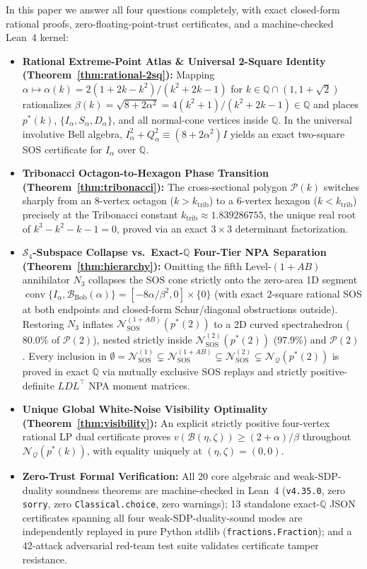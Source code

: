 \documentclass[11pt,a4paper]{article}
\newcommand{\QQ}{\mathbb{Q}}
\newcommand{\calN}{\mathcal{N}_{\mathcal{Q}}}
\newcommand{\calP}{\mathcal{P}}
\newcommand{\calB}{\mathcal{B}}
\newcommand{\calS}{\mathcal{S}}
\newcommand{\conv}{\operatorname{conv}}
\begin{document}
In this paper we answer all four questions completely, with exact closed-form rational proofs, zero-floating-point-trust certificates, and a machine-checked Lean~4 kernel:
\begin{itemize}[leftmargin=1.5em,itemsep=2pt]
  \item \textbf{Rational Extreme-Point Atlas \& Universal 2-Square Identity (Theorem~\ref{thm:rational-2sq}):} Mapping $\alpha \mapsto \alpha(k) = 2(1+2k-k^2)/(k^2+2k-1)$ for $k \in \QQ \cap (1, 1+\sqrt{2})$ rationalizes $\beta(k) = \sqrt{8+2\alpha^2} = 4(k^2+1)/(k^2+2k-1) \in \QQ$ and places $p^*(k)$, $\{I_\alpha, S_\alpha, D_\alpha\}$, and all normal-cone vertices inside $\QQ$. In the universal involutive Bell algebra, $I_\alpha^2 + Q_\alpha^2 \equiv (8+2\alpha^2)I$ yields an exact two-square SOS certificate for $I_\alpha$ over $\QQ$.
  \item \textbf{Tribonacci Octagon-to-Hexagon Phase Transition (Theorem~\ref{thm:tribonacci}):} The cross-sectional polygon $\calP(k)$ switches sharply from an 8-vertex octagon ($k > k_{\mathrm{trib}}$) to a 6-vertex hexagon ($k < k_{\mathrm{trib}}$) precisely at the Tribonacci constant $k_{\mathrm{trib}} \approx 1.839286755$, the unique real root of $k^3 - k^2 - k - 1 = 0$, proved via an exact $3\times 3$ determinant factorization.
  \item \textbf{$\calS_4$-Subspace Collapse vs.\ Exact-$\QQ$ Four-Tier NPA Separation (Theorem~\ref{thm:hierarchy}):} Omitting the fifth Level-$(1+AB)$ annihilator $N_3$ collapses the SOS cone strictly onto the zero-area 1D segment $\conv\{I_\alpha, \calB_{\mathrm{Bob}}(\alpha)\} = [-8\alpha/\beta^2, 0]\times\{0\}$ (with exact 2-square rational SOS at both endpoints and closed-form Schur/diagonal obstructions outside). Restoring $N_3$ inflates $\mathcal{N}_{\mathrm{SOS}}^{(1+AB)}(p^*(2))$ to a 2D curved spectrahedron ($80.0\%$ of $\calP(2)$), nested strictly inside $\mathcal{N}_{\mathrm{SOS}}^{(2)}(p^*(2))$ ($97.9\%$) and $\calP(2)$. Every inclusion in $\emptyset = \mathcal{N}_{\mathrm{SOS}}^{(1)} \subsetneq \mathcal{N}_{\mathrm{SOS}}^{(1+AB)} \subsetneq \mathcal{N}_{\mathrm{SOS}}^{(2)} \subsetneq \calN(p^*(2))$ is proved in exact $\QQ$ via mutually exclusive SOS replays and strictly positive-definite $LDL^\top$ NPA moment matrices.
  \item \textbf{Unique Global White-Noise Visibility Optimality (Theorem~\ref{thm:visibility}):} An explicit strictly positive four-vertex rational LP dual certificate proves $v(\calB(\eta,\zeta)) \ge (2+\alpha)/\beta$ throughout $\calN(p^*(k))$, with equality uniquely at $(\eta,\zeta) = (0,0)$.
  \item \textbf{Zero-Trust Formal Verification:} All 20 core algebraic and weak-SDP-duality soundness theorems are machine-checked in Lean~4 (\texttt{v4.35.0}, zero \texttt{sorry}, zero \texttt{Classical.choice}, zero warnings); 13 standalone exact-$\QQ$ JSON certificates spanning all four weak-SDP-duality-sound modes are independently replayed in pure Python stdlib (\texttt{fractions.Fraction}); and a 42-attack adversarial red-team test suite validates certificate tamper resistance.
\end{itemize}
\end{document}

